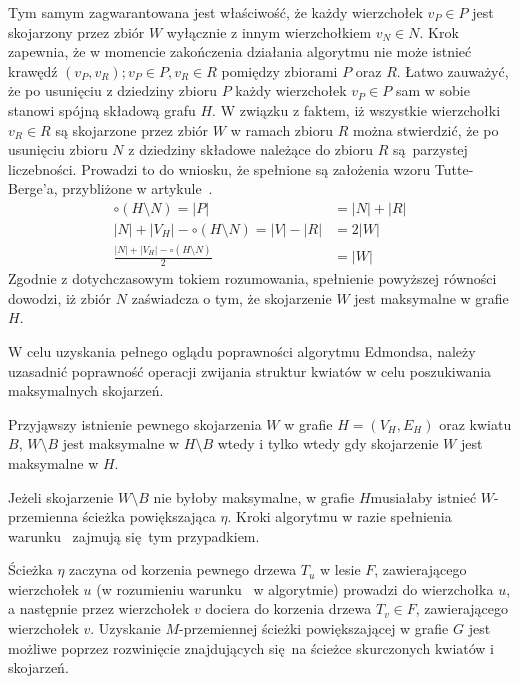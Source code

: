{\begin{bproof}
    Tym samym zagwarantowana jest właściwość, że każdy wierzchołek $v_P \in P$ jest skojarzony przez zbiór $W$ wyłącznie z innym wierzchołkiem $v_N \in N$.
    Krok~ zapewnia, że w momencie zakończenia działania algorytmu nie może istnieć krawędź $(v_P, v_R); v_P \in P, v_R \in R$ pomiędzy zbiorami $P$ oraz $R$.
    Łatwo zauważyć, że po usunięciu z dziedziny zbioru $P$ każdy wierzchołek $v_P \in P$ sam w sobie stanowi spójną składową grafu $H$.
    W związku z faktem, iż wszystkie wierzchołki $v_R \in R$ są skojarzone przez zbiór $W$ w ramach zbioru $R$ można stwierdzić, że po usunięciu zbioru $N$ z dziedziny składowe należące do zbioru $R$ są parzystej liczebności.
    Prowadzi to do wniosku, że spełnione są założenia wzoru Tutte-Berge'a, przybliżone w artykule~\cite{cohen:hal-00358468}.
    \begin{align*}
        \circ(H \setminus N) = |P| &= |N| + |R|\\
        |N| + |V_H| - \circ(H \setminus N) = |V| - |R| &= 2|W|\\
        \frac{|N| + |V_H| - \circ (H \setminus N)}{2} &= |W|
    \end{align*}
    Zgodnie z dotychczasowym tokiem rozumowania, spełnienie powyższej równości dowodzi, iż zbiór $N$ zaświadcza o tym, że skojarzenie $W$ jest maksymalne w grafie $H$.
  \end{bproof}
  W celu uzyskania pełnego oglądu poprawności algorytmu Edmondsa, należy uzasadnić poprawność operacji zwijania struktur kwiatów w celu poszukiwania maksymalnych skojarzeń.
  \begin{theorem}
    Przyjąwszy istnienie pewnego skojarzenia $W$ w grafie $H=(V_H, E_H)$ oraz kwiatu $B$, $W \setminus B$ jest maksymalne w $H \setminus B$ wtedy i tylko wtedy gdy skojarzenie $W$ jest maksymalne w $H$.
  \end{theorem}
  \begin{bproof}
    Jeżeli skojarzenie $W \setminus B$ nie byłoby maksymalne, w grafie $H$musiałaby istnieć $W$-przemienna ścieżka powiększająca $\eta$.
    Kroki algorytmu w razie spełnienia warunku~ zajmują się tym przypadkiem.

    Ścieżka $\eta$ zaczyna od korzenia pewnego drzewa $T_u$ w lesie $F$, zawierającego wierzchołek $u$ (w rozumieniu warunku~ w algorytmie) prowadzi do wierzchołka $u$, a następnie przez wierzchołek $v$ dociera do korzenia drzewa $T_v \in F$, zawierającego wierzchołek $v$.
    Uzyskanie $M$-przemiennej ścieżki powiększającej w grafie $G$ jest możliwe poprzez rozwinięcie znajdujących się na ścieżce skurczonych kwiatów i 
    skojarzeń.


\end{bproof}}

